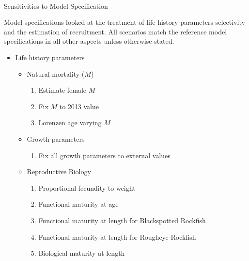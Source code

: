 \documentclass[
]{scrartcl}
\makeatletter
\let\oldparagraph\paragraph
\renewcommand{\paragraph}{
    \@ifstar
      \xxxParagraphStar
      \xxxParagraphNoStar
  }
\newcommand{\xxxParagraphStar}[1]{\oldparagraph*{#1}\mbox{}}
\newcommand{\xxxParagraphNoStar}[1]{\oldparagraph{#1}\mbox{}}
\providecommand{\tightlist}{%
  \setlength{\itemsep}{0pt}\setlength{\parskip}{0pt}}\usepackage{longtable,booktabs,array}
\makeatother
\begin{document}
\paragraph{Sensitivities to Model Specification}\label{senstivities}

Model specifications looked at the treatment of life history parameters
selectivity and the estimation of recruitment. All scenarios match the
reference model specifications in all other aspects unless otherwise
stated.

\begin{itemize}
\item
  Life history parameters

  \begin{itemize}
  \item
    Natural mortality (\(M\))

    \begin{enumerate}
    \def\labelenumi{\arabic{enumi}.}
    \tightlist
    \item
      Estimate female \(M\)
    \item
      Fix \(M\) to 2013 value\\
    \item
      Lorenzen age varying \(M\)
    \end{enumerate}
  \item
    Growth parameters

    \begin{enumerate}
    \def\labelenumi{\arabic{enumi}.}
    \setcounter{enumi}{3}
    \tightlist
    \item
      Fix all growth parameters to external values
    \end{enumerate}
  \item
    Reproductive Biology

    \begin{enumerate}
    \def\labelenumi{\arabic{enumi}.}
    \setcounter{enumi}{4}
    \tightlist
    \item
      Proportional fecundity to weight
    \item
      Functional maturity at age
    \item
      Functional maturity at length for Blackspotted Rockfish
    \item
      Functional maturity at length for Rougheye Rockfish
    \item
      Biological maturity at length
    \end{enumerate}
  \end{itemize}
\end{itemize}
\end{document}
